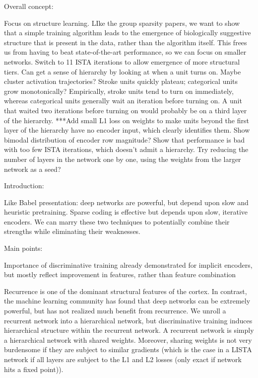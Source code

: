 Overall concept:

Focus on structure learning.  LIke the group sparsity papers, we want to show that a simple training algorithm leads to the emergence of biologically suggestive structure that is present in the data, rather than the algorithm itself.  This frees us from having to beat state-of-the-art performance, so we can focus on smaller networks.  
Switch to 11 ISTA iterations to allow emergence of more structural tiers.  
Can get a sense of hierarchy by looking at when a unit turns on.  Maybe cluster activation trajectories?  Stroke units quickly plateau; categorical units grow monotonically?  Empirically, stroke units tend to turn on immediately, whereas categorical units generally wait an iteration before turning on.  A unit that waited two iterations before turning on would probably be on a third layer of the hierarchy.  
***Add small L1 loss on weights to make units beyond the first layer of the hierarchy have no encoder input, which clearly identifies them.  Show bimodal distribution of encoder row magnitude?
Show that performance is bad with too few ISTA iterations, which doesn't admit a hierarchy.  Try reducing the number of layers in the network one by one, using the weights from the larger network as a seed?



Introduction:

Like Babel presentation: deep networks are powerful, but depend upon slow and heuristic pretraining.  Sparse coding is effective but depends upon slow, iterative encoders.  We can marry these two techniques to potentially combine their strengths while eliminating their weaknesses.




Main points:

Importance of discriminative training already demonstrated for implicit encoders, but mostly reflect improvement in features, rather than feature combination
 
Recurrence is one of the dominant structural features of the cortex.  In contrast, the machine learning community has found that deep networks can be extremely powerful, but has not realized much benefit from recurrence.  We unroll a recurrent network into a hierarchical network, but discriminative training induces hierarchical structure within the recurrent network.  A recurrent network is simply a hierarchical network with shared weights.  Moreover, sharing weights is not very burdensome if they are subject to similar gradients (which is the case in a LISTA network if all layers are subject to the L1 and L2 losses (only exact if network hits a fixed point)).  

